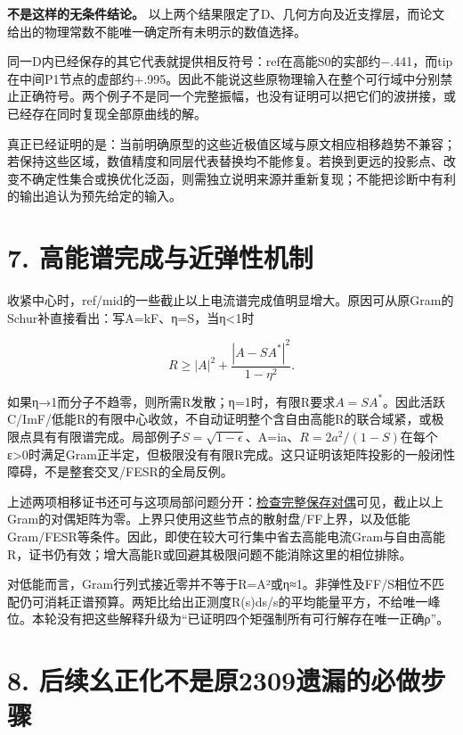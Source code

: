\documentclass[
  10pt,
  a4paper,
]{article}
\begin{document}
\textbf{不是这样的无条件结论。}
以上两个结果限定了D、几何方向及近支撑层，而论文给出的物理常数不能唯一确定所有未明示的数值选择。

同一D内已经保存的其它代表就提供相反符号：ref在高能S0的实部约−.441，而tip在中间P1节点的虚部约+.995。因此不能说这些原物理输入在整个可行域中分别禁止正确符号。两个例子不是同一个完整振幅，也没有证明可以把它们的波拼接，或已经存在同时复现全部原曲线的解。

真正已经证明的是：当前明确原型的这些近极值区域与原文相应相移趋势不兼容；若保持这些区域，数值精度和同层代表替换均不能修复。若换到更远的投影点、改变不确定性集合或换优化泛函，则需独立说明来源并重新复现；不能把诊断中有利的输出追认为预先给定的输入。

\section{7.
高能谱完成与近弹性机制}\label{ux9ad8ux80fdux8c31ux5b8cux6210ux4e0eux8fd1ux5f39ux6027ux673aux5236}

收紧中心时，ref/mid的一些截止以上电流谱完成值明显增大。原因可从原Gram的Schur补直接看出：写A=kF、η=\textbar S\textbar，当η\textless1时

\[R\ge |A|^2+\frac{|A-SA^*|^2}{1-\eta^2}.\]

如果η→1而分子不趋零，则所需R发散；η=1时，有限R要求\(A=SA^*\)。因此活跃C/ImF/低能R的有限中心收敛，不自动证明整个含自由高能R的联合域紧，或极限点具有有限谱完成。局部例子\(S=\sqrt{1-\epsilon}\)、A=ia、\(R=2a^2/(1-S)\)在每个ε\textgreater0时满足Gram正半定，但极限没有有限R完成。这只证明该矩阵投影的一般闭性障碍，不是整套交叉/FESR的全局反例。

上述两项相移证书还可与这项局部问题分开：\href{../HIGH_GRAM_DUAL_SCOPE.json}{检查完整保存对偶}可见，截止以上Gram的对偶矩阵为零。上界只使用这些节点的散射盘/FF上界，以及低能Gram/FESR等条件。因此，即使在较大可行集中省去高能电流Gram与自由高能R，证书仍有效；增大高能R或回避其极限问题不能消除这里的相位排除。

对低能而言，Gram行列式接近零并不等于R=\textbar A\textbar²或η≈1。非弹性及FF/S相位不匹配仍可消耗正谱预算。两矩比给出正测度R(s)ds/s的平均能量平方，不给唯一峰位。本轮没有把这些解释升级为``已证明四个矩强制所有可行解存在唯一正确ρ''。

\section{8.
后续幺正化不是原2309遗漏的必做步骤}\label{ux540eux7eedux5e7aux6b63ux5316ux4e0dux662fux539f2309ux9057ux6f0fux7684ux5fc5ux505aux6b65ux9aa4}
\end{document}
